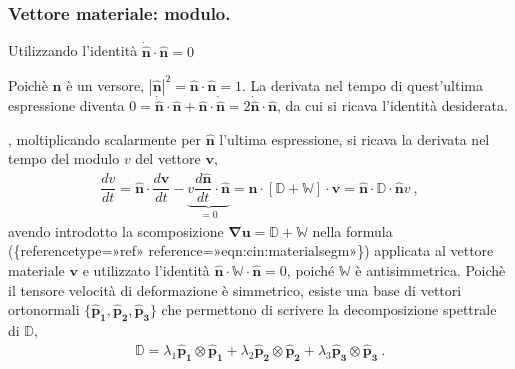 \documentclass[letterpaper,10pt,italian]{jupyterBook}
\begin{document}
\subsubsection{Vettore materiale: modulo.}
\label{\detokenize{polimi/fluidmechanics-ita/template/capitoli/03_cinematica/12teoria:vettore-materiale-modulo}}
\sphinxAtStartPar
Utilizzando l’identità \(\mathbf{\dot{\hat{n}}} \cdot \mathbf{\hat{n}} = 0\)%
\begin{footnote}[1]\sphinxAtStartFootnote
Poichè \(\mathbf{\hat{n}}\) è un versore,
\(|\mathbf{\hat{n}}|^2 = \mathbf{\hat{n}}\cdot\mathbf{\hat{n}} = 1\). La derivata
nel tempo di quest’ultima espressione diventa
\(0 = \mathbf{\dot{\hat{n}}} \cdot \mathbf{\hat{n}} + \mathbf{\hat{n}} \cdot \mathbf{\dot{\hat{n}}} = 2 \mathbf{\dot{\hat{n}}} \cdot \mathbf{\hat{n}}\),
da cui si ricava l’identità desiderata.
%
\end{footnote},
moltiplicando scalarmente per \(\mathbf{\hat{n}}\) l’ultima espressione, si
ricava la derivata nel tempo del modulo \(v\) del vettore \(\mathbf{v}\),
\begin{equation*}
\begin{split}\label{eqn:cin:dvmod}
 \dfrac{d v}{d t} = \mathbf{\hat{n}} \cdot \dfrac{d \mathbf{v}}{dt} 
 - \underbrace{v \dfrac{d\mathbf{\hat{n}}}{dt}\cdot\mathbf{\hat{n}}}_{=0} = \mathbf{\hat{n}} \cdot \left[ \mathbb{D} + \mathbb{W} \right] \cdot \mathbf{v} = 
 \mathbf{\hat{n}} \cdot \mathbb{D} \cdot \mathbf{\hat{n}} v \ ,\end{split}
\end{equation*}
\sphinxAtStartPar
avendo
introdotto la scomposizione
\(\mathbf{\nabla} \mathbf{u} = \mathbb{D} + \mathbb{W}\) nella formula
(\{reference\sphinxhyphen{}type=»ref»
reference=»eqn:cin:material\sphinxhyphen{}segm»\}) applicata al vettore materiale
\(\mathbf{v}\) e utilizzato l’identità
\(\mathbf{\hat{n}} \cdot \mathbb{W} \cdot \mathbf{\hat{n}} = 0\), poiché
\(\mathbb{W}\) è antisimmetrica. Poichè il tensore velocità di
deformazione è simmetrico, esiste una base di vettori ortonormali
\(\{\mathbf{\hat{p}_1},\mathbf{\hat{p}_2},\mathbf{\hat{p}_3}\}\) che permettono di
scrivere la decomposizione spettrale di \(\mathbb{D}\),
\begin{equation*}
\begin{split}\mathbb{D} = \lambda_1 \mathbf{\hat{p}_1} \otimes \mathbf{\hat{p}_1} +
              \lambda_2 \mathbf{\hat{p}_2} \otimes \mathbf{\hat{p}_2} +
              \lambda_3 \mathbf{\hat{p}_3} \otimes \mathbf{\hat{p}_3} \ .\end{split}
\end{equation*}
\end{document}
